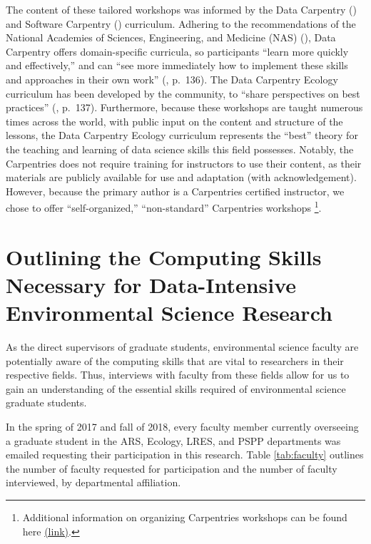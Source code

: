 \documentclass[12pt]{article}
\begin{document}
\quad The content of these tailored workshops was informed by the Data 
Carpentry (\citeyear {data-carpentry}) and Software Carpentry 
(\citeyear{software-carpentry}) curriculum. Adhering to the recommendations of 
the National Academies of Sciences, Engineering, and Medicine (NAS)
(\citeyear{nas}), Data Carpentry offers domain-specific curricula, so
participants ``learn more quickly and effectively,'' and can ``see more
immediately how to implement these skills and approaches in their own work''
(\citeyear{carpentry}, p.\ 136). The Data Carpentry Ecology curriculum has been
developed by the community, to ``share perspectives on best practices''
(\citeyear{carpentry}, p.\ 137). Furthermore, because these workshops are taught
numerous times across the world, with public input on the content and structure
of the lessons, the Data Carpentry Ecology curriculum represents the ``best''
theory for the teaching and learning of data science skills this field
possesses. Notably, the Carpentries does not require training for instructors
to use their content, as their materials are publicly available for use and
adaptation (with acknowledgement). However, because the primary author is a
Carpentries certified instructor, we chose to offer ``self-organized,''
``non-standard'' Carpentries workshops \footnote{Additional information on
organizing Carpentries workshops can be found here 
\href{https://bit.ly/carpentriesorganize}{(link)}.}. 

\section{Outlining the Computing Skills Necessary for Data-Intensive 
Environmental Science Research}
\label{sec:faculty}

\noindent As the direct supervisors of graduate students, environmental science
faculty are potentially aware of the computing skills that are vital to
researchers in their respective fields. Thus, interviews with faculty
from these fields allow for us to gain an understanding of the essential skills
required of environmental science graduate students. 

\quad In the spring of 2017 and fall of 2018, every faculty member
currently overseeing a graduate student in the ARS, Ecology, LRES, and PSPP
departments was emailed requesting their participation in this research. 
Table \ref{tab:faculty} outlines the number of faculty requested for
participation and the number of faculty interviewed, by departmental
affiliation. 
\end{document}
